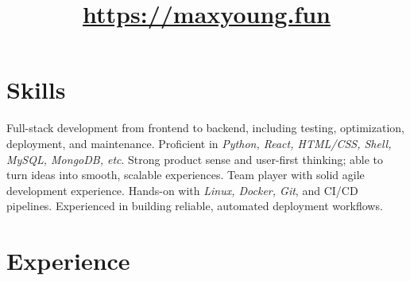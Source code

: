 \documentclass[11pt,a4paper]{moderncv}
\title{\href{https://maxyoung.fun}{https://maxyoung.fun}}
\begin{document}
\maketitle
\vspace{-0.5cm}

\section{Skills}
{
  Full-stack development from frontend to backend, including testing, optimization, deployment, and maintenance. Proficient in \textit{Python, React, HTML/CSS, Shell, MySQL, MongoDB, etc}. Strong product sense and user-first thinking; able to turn ideas into smooth, scalable experiences. Team player with solid agile development experience.
}
{
  Hands-on with \textit{Linux, Docker, Git}, and CI/CD pipelines. Experienced in building reliable, automated deployment workflows.
}

\section{Experience}
\end{document}

